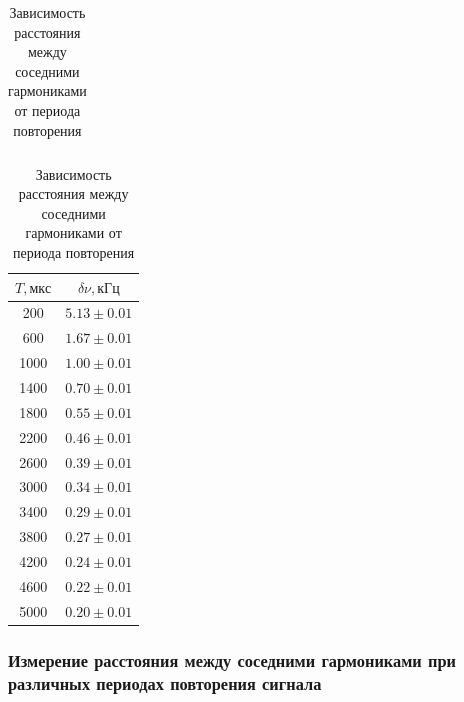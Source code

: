 \documentclass[a4paper, 12pt]{article}
\begin{document}
\begin{table}[ht]
\begin{minipage}[ht]{0.49\linewidth}
\begin{tabular}{|c|c|}
                        \end{tabular}
                        \caption{Зависимость полной ширины спектра от длительности импульса}
                        \label{tab:A.8}
                    \end{minipage}
                    \begin{minipage}[ht]{0.49\linewidth}
                        \centering
                        \begin{tabular}{|c|c|}
                            \hline

                            $T, мкс$ & $\delta \nu, кГц$\\ \hline
                            200 & $5.13 \pm 0.01$\\ \hline
                            600 & $1.67 \pm 0.01$\\ \hline
                            1000 & $1.00 \pm 0.01$\\ \hline
                            1400 & $0.70 \pm 0.01$\\ \hline
                            1800 & $0.55 \pm 0.01$\\ \hline
                            2200 & $0.46 \pm 0.01$\\ \hline
                            2600 & $0.39 \pm 0.01$\\ \hline
                            3000 & $0.34 \pm 0.01$\\ \hline
                            3400 & $0.29 \pm 0.01$\\ \hline
                            3800 & $0.27 \pm 0.01$\\ \hline
                            4200 & $0.24 \pm 0.01$\\ \hline
                            4600 & $0.22 \pm 0.01$\\ \hline
                            5000 & $0.20 \pm 0.01$\\ \hline

                        \end{tabular}
                        \caption{Зависимость расстояния между соседними гармониками от периода повторения}
                        \label{tab:A.9}
                    \end{minipage}
                \end{table}

            \subsubsection{Измерение расстояния между соседними гармониками при различных периодах повторения сигнала}
\end{document}
